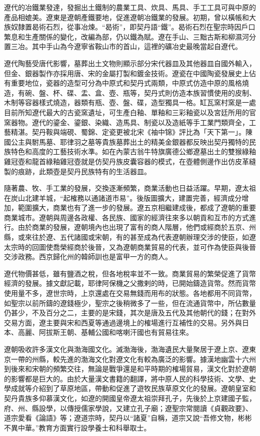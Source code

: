 遼代的冶鐵業發達，發掘出土鐵制的農業工具、炊具、馬具、手工工具可與中原的產品相媲美。遼東是遼朝產鐵要地，促進遼朝冶鐵業的發展。初期，曾以橫帳和大族奴隸置曷術石烈，從事冶煉。“曷術”，即契丹語“鐵”。曷術石烈在聖宗時因戶口繁息和生產關係的變化，改編為部，仍以鐵為賦。遼在手山、三黜古斯和柳濕河分置三冶。其中手山為今遼寧省鞍山市的首山，這裡的礦冶史最晚當起自遼代。

遼代陶藝受唐代影響，墓葬出土文物則顯示部分宋代器皿及其他器皿自國外輸入，但金、銀器製作亦採用唐、宋的金屬打製和鍍金技術。遼瓷在中國陶瓷發展史上佔有重要地位，瓷器的造型可分為中原式和契丹式兩類，中原式仿造中原的風格燒造，有碗、盤、杯、碟、盂、盒、壺、瓶等，契丹式則仿造本族習慣使用的皮制、木制等容器樣式燒造，器類有瓶、壺、盤、碟，造型獨具一格。缸瓦窯村窯是一處目前所知遼代最大的古瓷窯遺址，可生產白釉、單釉和三彩釉瓷以及宮廷所用的官窯器物。遼代的鎏金、鎏銀、染織、造馬具、制瓷以及造紙等手工業門類齊全，工藝精湛。契丹鞍與端硯、蜀錦、定瓷更被北宋《袖中锦》評比為「天下第一」。陳國公主與駙馬墓、耶律羽之墓等貴族墓葬出土的精美金銀器都反映出契丹獨特的民族特色和高度的工藝技術水準。如在內蒙古翁牛特旗廣德公鄉遼墓出土的雙猴綠釉雞冠壺和龍首綠釉雞冠壺就是仿契丹族皮囊容器的模式，在壺體側邊作出仿皮革縫製的痕跡，此類壺是契丹民族特有的生活器皿。


隨著農、牧、手工業的發展，交換逐漸頻繁，商業活動也日益活躍。早期，遼太祖在炭山北建羊城，“起榷務以通諸道市易”。後版圖擴大，建置完善，經濟成分增加，範圍擴大，商業也有了進一步的發展。遼五京相繼建成後，都成了遼朝的重要商業城市。遼朝與周邊各政權、各民族、國家的經濟往來多以朝貢和互市的方式進行。由於商業的發展，遼朝境內也出現了富有的商人階層，他們或經商於五京、州縣，或來往於遼、五代諸國或宋朝，有的甚至成為代表遼朝辦理交涉的使臣，如遼太宗時的回圖使喬榮經商於後晉，又為遼朝商業貿易的代表，並可作為使臣與後晉交涉政務。西京歸化州的韓師訓也是富甲一方的商人。

遼代物價甚低，雖有鹽酒之稅，但各地稅率並不一致。商業貿易的繁榮促進了貨幣經濟的發展。據文獻記載，耶律阿保機之父撒剌的時，已開始鑄造貨幣。然而貨幣使用量不多，遼世宗時，上京還處在交易無錢而用布的狀態。各地都用不同貨幣，如聖宗以前所鑄的遼錢極少，聖宗之後稍微多了一些，但在流通貨幣中，所佔數量仍甚少，不及百分之二，主要的是宋錢，其次是唐及五代及其他朝代的錢；在對外交易方面，遼主要與宋和西夏等通過邊境上的榷場進行互補性的交易。另外與日本、高麗、阿拔斯王朝、基輔公國和喀喇汗國也有貿易往來。

遼朝吸收許多漢文化與渤海國文化。滅渤海後，渤海遺民大量聚居于遼上京、遼東京一帶的州縣，較先進的渤海文化對遼文化有較為廣泛的影響。據漢地幽雲十六州到後來和宋朝的頻繁交往，無論是戰爭還是和平時期的榷場貿易，漢文化對於遼朝的影響都是巨大的。由於大量漢文書籍的翻譯，將中原人民的科學技術、文學、史學成就等介紹到了草原地區，帶動和促進了遊牧民族草原文化的發展。遼朝皇室和契丹貴族多仰慕漢文化，如遼的開國皇帝遼太祖崇拜孔子，先後於上京建國子監，府、州、縣設學，以傳授儒家學說，又建立孔子廟；遼聖宗常閱讀《貞觀政要》、道宗愛看《論語》等；遼道宗時，契丹以“諸夏”自稱，道宗又說“吾修文物，彬彬不異中華。”教育方面實行設學養士和科舉取士。

